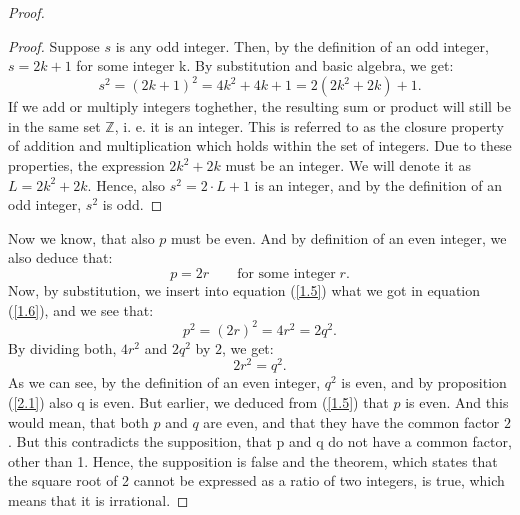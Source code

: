 \documentclass[11pt]{amsart}
\theoremstyle{definition}
\begin{document}
\begin{proof}
\begin{proof}
        Suppose \(s\) is any odd integer. Then, by the definition of an odd integer, \(s = 2k + 1\) for some integer k. By substitution and basic algebra, we get:
        \begin{equation}
            s^{2} = (2k + 1)^{2} = 4k^{2} + 4k + 1 = 2(2k^{2} + 2k) + 1.
        \end{equation}
        If we add or multiply integers toghether, the resulting sum or product will still be in the same set \(\mathbb{Z}\), i. e. it is an integer. This is referred to as the closure property of addition and multiplication which holds within the set of integers. Due to these properties, the expression \(2k^{2} + 2k\) must be an integer. We will denote it as \(L = 2k^{2} + 2k\). Hence, also \(s^{2} = 2 \cdot L + 1\) is an integer, and by the definition of an odd integer, \(s^{2}\) is odd.
    \end{proof}
    Now we know, that also \(p\) must be even. And by definition of an even integer, we also deduce that:
    \begin{equation}\label{1.6}
        p = 2r \qquad \text{for some integer} \; r.
    \end{equation}
    Now, by substitution, we insert into equation (\ref{1.5}) what we got in equation (\ref{1.6}), and we see that:
    \begin{equation}\label{1.7}
        p^{2} = (2r)^{2} = 4r^{2} = 2q^{2}.
    \end{equation}
    By dividing both, \(4r^{2}\) and \(2q^{2}\) by \(2\), we get:
    \begin{equation}\label{1.8}
        2r^{2} = q^{2}.
    \end{equation}
    As we can see, by the definition of an even integer, \(q^{2}\) is even, and by proposition (\ref{2.1}) also q is even. But earlier, we deduced from (\ref{1.5}) that \(p\) is even. And this would mean, that both \(p\) and \(q\) are even, and that they have the common factor \(2\). But this contradicts the supposition, that p and q do not have a common factor, other than 1. Hence, the supposition is false and the theorem, which states that the square root of 2 cannot be expressed as a ratio of two integers, is true, which means that it is irrational.
\end{proof}






\printbibliography
\end{document}
